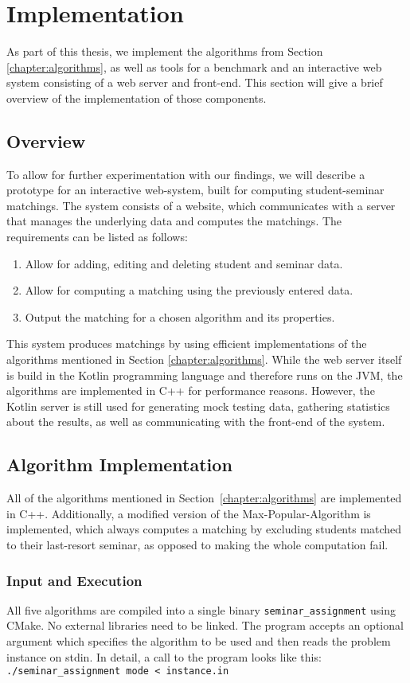 \section{Implementation}

As part of this thesis, we implement the algorithms from Section \ref{chapter:algorithms}, as well as tools for a benchmark and an interactive web system consisting of a web server and front-end. This section will give a brief overview of the implementation of those components.

\subsection{Overview}
To allow for further experimentation with our findings, we will describe a prototype for an interactive web-system, built for computing student-seminar matchings. The system consists of a website, which communicates with a server that manages the underlying data and computes the matchings. The requirements can be listed as follows:
\begin{enumerate}
    \item Allow for adding, editing and deleting student and seminar data.
    \item Allow for computing a matching using the previously entered data.
    \item Output the matching for a chosen algorithm and its properties.
\end{enumerate}
This system produces matchings by using efficient implementations of the algorithms mentioned in Section \ref{chapter:algorithms}. While the web server itself is build in the Kotlin programming language and therefore runs on the JVM, the algorithms are implemented in C++ for performance reasons. However, the Kotlin server is still used for generating mock testing data, gathering statistics about the results, as well as communicating with the front-end of the system.

\subsection{Algorithm Implementation}
All of the algorithms mentioned in \mbox{Section \ref{chapter:algorithms}} are implemented in C++. Additionally, a modified version of the Max-Popular-Algorithm is implemented, which always computes a matching by excluding students matched to their last-resort seminar, as opposed to making the whole computation fail.

\subsubsection{Input and Execution}
All five algorithms are compiled into a single binary \lstinline{seminar_assignment} using CMake. No external libraries need to be linked. The program accepts an optional argument which specifies the algorithm to be used and then reads the problem instance on stdin. In detail, a call to the program looks like this: \lstinline{./seminar_assignment mode < instance.in} 

